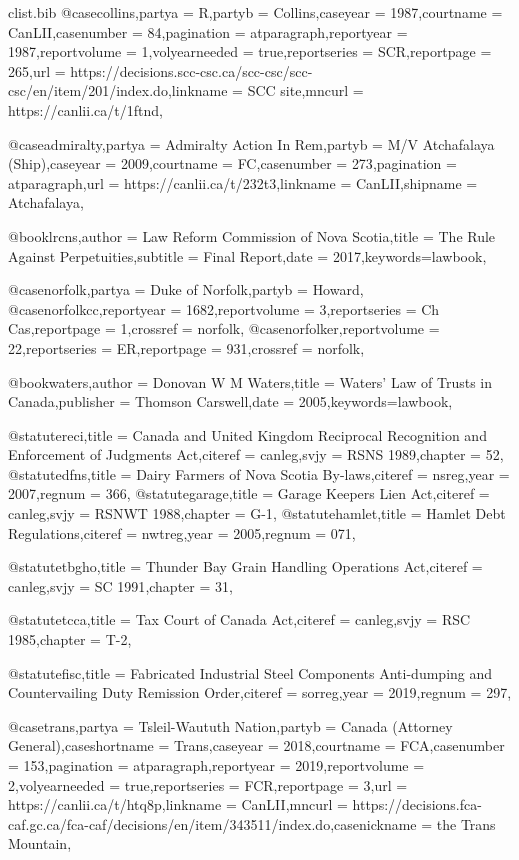 \begin{filecontents*}[overwrite]{clist\jobname.bib}
@case{collins,partya =  {R},partyb =  {Collins},caseyear =  {1987},courtname =  {CanLII},casenumber =  {84},pagination =  {atparagraph},reportyear =  {1987},reportvolume =  {1},volyearneeded =  {true},reportseries =  {SCR},reportpage =  {265},url =  {https://decisions.scc-csc.ca/scc-csc/scc-csc/en/item/201/index.do},linkname =  {SCC site},mncurl =  {https://canlii.ca/t/1ftnd},}

@case{admiralty,partya =  {Admiralty Action In Rem},partyb =  {M/V Atchafalaya (Ship)},caseyear =  {2009},courtname =  {FC},casenumber =  {273},pagination =  {atparagraph},url =  {https://canlii.ca/t/232t3},linkname =  {CanLII},shipname =  {Atchafalaya},}


@book{lrcns,author =  {{Law Reform Commission of Nova Scotia}},title =  {The Rule Against Perpetuities},subtitle =  {Final Report},date =  {2017},keywords={lawbook},}

@case{norfolk,partya =  {Duke of Norfolk},partyb =  {Howard},}
@case{norfolkcc,reportyear =  {1682},reportvolume =  {3},reportseries =  {Ch Cas},reportpage =  {1},crossref =  {norfolk},}
@case{norfolker,reportvolume =  {22},reportseries =  {ER},reportpage =  {931},crossref =  {norfolk},}


@book{waters,author =  {Donovan W M Waters},title =  {Waters' Law of Trusts in Canada},publisher =  {Thomson Carswell},date =  {2005},keywords={lawbook},}

@statute{reci,title =  {Canada and United Kingdom Reciprocal Recognition and Enforcement of Judgments Act},citeref =  {canleg},svjy =  {RSNS 1989},chapter =  {52},}
@statute{dfns,title =  {Dairy Farmers of Nova Scotia By-laws},citeref =  {nsreg},year =  {2007},regnum =  {366},}
@statute{garage,title =  {Garage Keepers Lien Act},citeref =  {canleg},svjy =  {RSNWT 1988},chapter =  {G-1},}
@statute{hamlet,title =  {Hamlet Debt Regulations},citeref =  {nwtreg},year =  {2005},regnum =  {071},}


@statute{tbgho,title =  {Thunder Bay Grain Handling Operations Act},citeref =  {canleg},svjy =  {SC 1991},chapter =  {31},}

@statute{tcca,title =  {Tax Court of Canada Act},citeref =  {canleg},svjy =  {RSC 1985},chapter =  {T-2},}

@statute{fisc,title =  {Fabricated Industrial Steel Components Anti-dumping and Countervailing Duty Remission Order},citeref =  {sorreg},year =  {2019},regnum =  {297},}

@case{trans,partya =  {Tsleil-Waututh Nation},partyb =  {Canada (Attorney General)},caseshortname =  {Trans},caseyear =  {2018},courtname =  {FCA},casenumber =  {153},pagination =  {atparagraph},reportyear =  {2019},reportvolume =  {2},volyearneeded =  {true},reportseries =  {FCR},reportpage =  {3},url =  {https://canlii.ca/t/htq8p},linkname =  {CanLII},mncurl =  {https://decisions.fca-caf.gc.ca/fca-caf/decisions/en/item/343511/index.do},casenickname =  {the Trans Mountain},}


\end{filecontents*}
